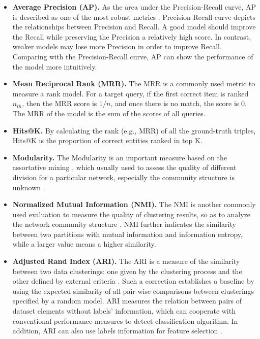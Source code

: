\begin{itemize}
	\item \textbf{Average Precision (AP).} As the area under the Precision-Recall curve, AP is described as one of the most robust metrics \cite{boyd2013area}. Precision-Recall curve depicts the relationships between Precision and Recall. A good model should improve the Recall while preserving the Precision a relatively high score. In contrast, weaker models may lose more Precision in order to improve Recall. Comparing with the Precision-Recall curve, AP can show the performance of the model  more intuitively.

	\item \textbf{Mean Reciprocal Rank (MRR).} The MRR is a commonly used metric to measure a rank model. For a target query, if the first correct item is ranked $n_{th}$, then the MRR score is $1 / n$, and once there is no match, the score is 0. The MRR of the model is the sum of the scores of all queries.

	\item \textbf{Hits@K.} By calculating the rank (e.g., MRR) of all the ground-truth triples, Hits@K is the proportion of correct entities ranked in top K.

	\item \textbf{Modularity.} The Modularity is an important measure based on the assortative mixing \cite{newman2003mixing},  which usually used to assess the quality of different division for a particular network, especially the community structure is unknown \cite{newman2004finding}.

	\item \textbf{Normalized Mutual Information (NMI).} The NMI is another commonly used evaluation to measure the quality of clustering results, so as to analyze the network community structure \cite{danon2005comparing}. NMI further indicates the similarity between two partitions with mutual information and information entropy, while a larger value means a higher similarity.

	\item \textbf{Adjusted Rand Index (ARI).} The ARI is a measure of the similarity between two data clusterings: one given by the clustering process and the other defined by external criteria \cite{santos2009use}. Such a correction establishes a baseline by using the expected similarity of all pair-wise comparisons between clusterings specified by a random model. ARI measures the relation between pairs of dataset elements without labels' information, which can cooperate with conventional performance measures to detect classification algorithm. In addition, ARI can also use labels information for feature selection \cite{santos2009use}.


\end{itemize}

